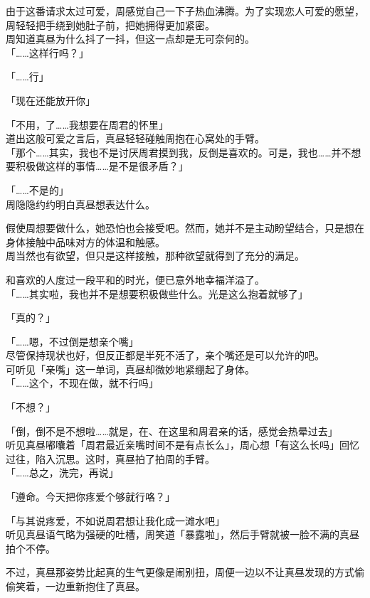 由于这番请求太过可爱，周感觉自己一下子热血沸腾。为了实现恋人可爱的愿望，周轻轻把手绕到她肚子前，把她拥得更加紧密。\\

周知道真昼为什么抖了一抖，但这一点却是无可奈何的。\\

「……这样行吗？」

「……行」

「现在还能放开你」

「不用，了……我想要在周君的怀里」\\

道出这般可爱之言后，真昼轻轻碰触周抱在心窝处的手臂。\\

「那个……其实，我也不是讨厌周君摸到我，反倒是喜欢的。可是，我也……并不想要积极做这样的事情……是不是很矛盾？」

「……不是的」\\

周隐隐约约明白真昼想表达什么。

假使周想要做什么，她恐怕也会接受吧。然而，她并不是主动盼望结合，只是想在身体接触中品味对方的体温和触感。\\

周当然也有欲望，但只是这样接触，那种欲望就得到了充分的满足。

和喜欢的人度过一段平和的时光，便已意外地幸福洋溢了。\\

「……其实啦，我也并不是想要积极做些什么。光是这么抱着就够了」

「真的？」

「……嗯，不过倒是想亲个嘴」\\

尽管保持现状也好，但反正都是半死不活了，亲个嘴还是可以允许的吧。\\

可听见「亲嘴」这一单词，真昼却微妙地紧绷起了身体。\\

「……这个，不现在做，就不行吗」

「不想？」

「倒，倒不是不想啦……就是，在、在这里和周君亲的话，感觉会热晕过去」\\

听见真昼嘟囔着「周君最近亲嘴时间不是有点长么」，周心想「有这么长吗」回忆过往，陷入沉思。这时，真昼拍了拍周的手臂。\\

「……总之，洗完，再说」

「遵命。今天把你疼爱个够就行咯？」

「与其说疼爱，不如说周君想让我化成一滩水吧」\\

听见真昼语气略为强硬的吐槽，周笑道「暴露啦」，然后手臂就被一脸不满的真昼拍个不停。

不过，真昼那姿势比起真的生气更像是闹别扭，周便一边以不让真昼发现的方式偷偷笑着，一边重新抱住了真昼。
